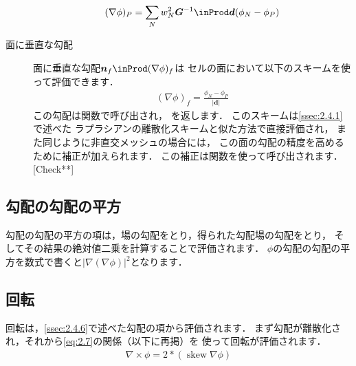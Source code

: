 \begin{description}
            \begin{align}
             \label{eq:2.27}
             (\nabla\phi)_{P}
             = \sum_{N}w_{N}^{2}\bm{G}^{-1} \inProd \bm{d}(\phi_{N} - \phi_{P})
            \end{align}
%
 \item[面に垂直な勾配] 面に垂直な勾配$\bm{n}_{f} \inProd (\nabla\phi)_{f}$は
            セルの面において以下のスキームを使って評価できます．
            \begin{align}
             \label{eq:2.28}
             (\nabla\phi)_{f} = \frac{\phi_{N} - \phi_{P}}{|\bm{d}|}
            \end{align}
            この勾配は関数で呼び出され，
            を返します．
            このスキームは\autoref{ssec:2.4.1}で述べた
            ラプラシアンの離散化スキームと似た方法で直接評価され，
            また同じように非直交メッシュの場合には，
            この面の勾配の精度を高めるために補正が加えられます．
            この補正は関数を使って呼び出されます．
            [Check**]
\end{description}


\subsection{勾配の勾配の平方}
\label{ssec:2.4.7}
勾配の勾配の平方の項は，場の勾配をとり，得られた勾配場の勾配をとり，
そしてその結果の絶対値二乗を計算することで評価されます．
$\phi$の勾配の勾配の平方を数式で書くと$|\nabla (\nabla\phi)|^{2}$となります．


\subsection{回転}
\label{ssec:2.4.8}
回転は，\autoref{ssec:2.4.6}で述べた勾配の項から評価されます．
まず勾配が離散化され，それから\autoref{eq:2.7}の関係（以下に再掲）を
使って回転が評価されます．
\begin{align*}
 \nabla \times \phi = 2 \mathop{*} (\mathop{\mathrm{skew}}\nabla\phi)
\end{align*}


